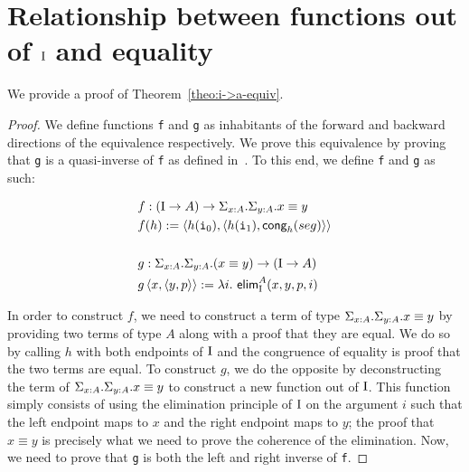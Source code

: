 \documentclass[12pt,twoside,maitrise]{dms}
\theoremstyle{definition}
\numberwithin{equation}{section}
\numberwithin{table}{chapter}
\numberwithin{figure}{chapter}
\newcommand\kw[1] {\textsf{#1}}
\newcommand\id[1] {\texttt{#1}}
\newcommand\fn[1] {\texttt{#1}}
\begin{document}
\section{Relationship between functions out of $\mathrm{I}$ and equality}\label{app:proof-i->a-equiv}

We provide a proof of Theorem~\ref{theo:i->a-equiv}.

\begin{proof}
We define functions \id{f} and \id{g} as inhabitants of the forward and backward
directions of the equivalence respectively. We prove this equivalence by proving
that \fn{g} is a quasi-inverse of \fn{f} as defined in~\cite[Chap.
  2]{HoTTbook}. To this end, we define \id{f} and \id{g} as such:


\begin{align*}
  & f : (\bI \rightarrow A) \rightarrow \Sigma_{\oftype{x}{A}} . \Sigma_{\oftype{y}{A}} . \eqtype{x}{y} \\
  & f(h) := \braket{h(\ileft), \braket{h(\iright), \kw{cong}_{h}(seg)}} \\ \\
  & g : \Sigma_{\oftype{x}{A}} . \Sigma_{\oftype{y}{A}} . (\eqtype{x}{y}) \rightarrow  (\bI \rightarrow A) \\
  & g \braket{x, \braket{y, p}} := \lambda i . \ \kw{elim}_{\bI}^{A}(x, y, p, i)
\end{align*}

In order to construct $f$, we need to construct a term of type
$\Sigma_{\oftype{x}{A}} . \Sigma_{\oftype{y}{A}} . \eqtype{x}{y}$ by providing
two terms of type $A$ along with a proof that they are equal. We do so by
calling $h$ with both endpoints of $\mathrm{I}$ and the congruence of equality is proof
that the two terms are equal. To construct $g$, we do the opposite by
deconstructing the term of $\Sigma_{\oftype{x}{A}} . \Sigma_{\oftype{y}{A}} .
\eqtype{x}{y}$ to construct a new function out of $\mathrm{I}$. This function simply
consists of using the elimination principle of $\mathrm{I}$ on the argument $i$ such
that the left endpoint maps to $x$ and the right endpoint maps to $y$; the proof
that $x \equiv y$ is precisely what we need to prove the coherence of the
elimination. Now, we need to prove that \id{g} is both the left and right
inverse of \id{f}.


\end{proof}
\end{document}
